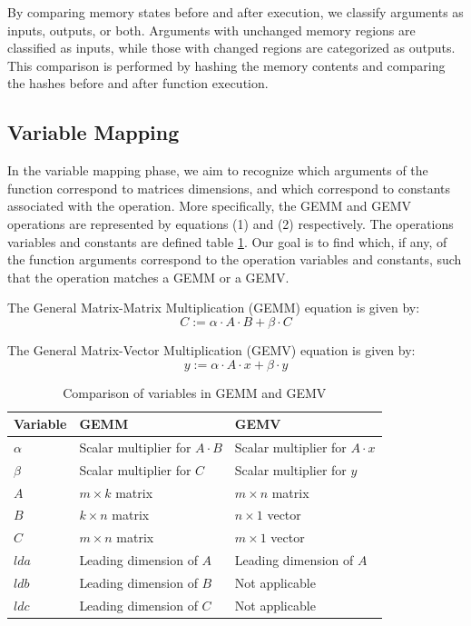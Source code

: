 \documentclass[manuscript,screen,review]{acmart}
\begin{document}
By comparing memory states before and after execution, we classify arguments as inputs, outputs, or both. Arguments with unchanged memory regions are classified as inputs, while those with changed regions are categorized as outputs. This comparison is performed by hashing the memory contents and comparing the hashes before and after function execution.

\subsection{Variable Mapping}

In the variable mapping phase, we aim to recognize which arguments of the function correspond to matrices dimensions, and which correspond to constants associated with the operation. More specifically, the GEMM and GEMV operations are represented by equations (1) and (2) respectively. The operations variables and constants are defined table \ref{variables}. Our goal is to find which, if any, of the function arguments correspond to the operation variables and constants, such that the operation matches a GEMM or a GEMV.

The General Matrix-Matrix Multiplication (GEMM) equation is given by:
\begin{equation}
	C := \alpha \cdot A \cdot B + \beta \cdot C
\end{equation}

The General Matrix-Vector Multiplication (GEMV) equation is given by:
\begin{equation}
	y := \alpha \cdot A \cdot x + \beta \cdot y
\end{equation}


\begin{table}[h!]
	\centering
	\begin{tabularx}{\textwidth}{|X|X|X|}
		\hline
		\textbf{Variable} & \textbf{GEMM} & \textbf{GEMV} \\
		\hline
		\(\alpha\) & Scalar multiplier for \(A \cdot B\) & Scalar multiplier for \(A \cdot x\) \\
		\hline
		\(\beta\) & Scalar multiplier for \(C\) & Scalar multiplier for \(y\) \\
		\hline
		\(A\) & \(m \times k\) matrix & \(m \times n\) matrix \\
		\hline
		\(B\) & \(k \times n\) matrix & \(n \times 1\) vector \\
		\hline
		\(C\) & \(m \times n\) matrix & \(m \times 1\) vector \\
		\hline
		\(lda\) & Leading dimension of \(A\) & Leading dimension of \(A\) \\
		\hline
		\(ldb\) & Leading dimension of \(B\) & Not applicable \\
		\hline
		\(ldc\) & Leading dimension of \(C\) & Not applicable \\
		\hline
	\end{tabularx}
	\caption{Comparison of variables in GEMM and GEMV}
	\label{variables}
\end{table}
\end{document}
